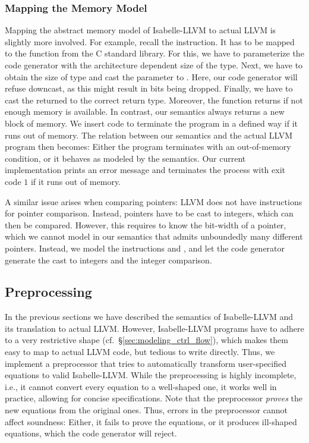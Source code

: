 \documentclass[a4paper,USenglish,cleveref, autoref]{lipics-v2019}
\begin{document}
\subsubsection{Mapping the Memory Model}
Mapping the abstract memory model of Isabelle-LLVM to actual LLVM is slightly more involved.
For example, recall the  instruction. It has to be mapped to the function  from
the C standard library. For this, we have to parameterize the code generator with the architecture dependent size of the  type. 
Next, we have to obtain the size of type  and cast the  parameter to . Here, our code generator will refuse downcast, as this might result in bits being dropped. Finally, we have to cast the returned  to the correct return type. 
Moreover, the  function returns  if not enough memory is available. In contrast, our semantics always returns a new block of memory.
We insert code to terminate the program in a defined way if it runs out of memory. The relation between our semantics and the actual LLVM program then 
becomes: Either the program terminates with an out-of-memory condition, or it behaves as modeled by the semantics. 
Our current implementation prints an error message and terminates the process with exit code $1$ if it runs out of memory.

A similar issue arises when comparing pointers: LLVM does not have instructions for pointer comparison. Instead, pointers have to be cast to integers, which can then be compared. However, this requires to know the bit-width of a pointer, which we cannot model in our semantics that admits unboundedly many different pointers.
Instead, we model the instructions  and , and let the code generator generate the cast to integers and the integer comparison. 


\subsection{Preprocessing}
In the previous sections we have described the semantics of Isabelle-LLVM and its translation to actual LLVM.
However, Isabelle-LLVM programs have to adhere to a very restrictive shape (cf.~\S\ref{sec:modeling_ctrl_flow}), 
which makes them easy to map to actual LLVM code, but tedious to write directly.
Thus, we implement a preprocessor that tries to automatically transform user-specified equations to 
valid Isabelle-LLVM. While the preprocessing is highly incomplete, i.e., it cannot convert every equation to a well-shaped one, 
it works well in practice, allowing for concise specifications.
Note that the preprocessor \emph{proves} the new equations from the original ones.
Thus, errors in the preprocessor cannot affect soundness: Either, it fails to prove the equations, or it produces ill-shaped equations, 
which the code generator will reject.
\end{document}
